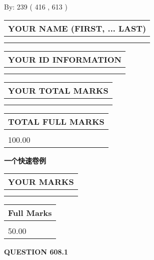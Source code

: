 \documentclass{ctexart}
\begin{document}
   
\hspace{1.0in} By: 
 239 ( 416 ,  613 )
   
   
   
   
\newpage 
\setcounter{page}{ 
   608001 } 
   
   
   
   
\noindent\begin{tabular}{|l|}
\hline
YOUR NAME (FIRST, ... LAST)  \\
\hline
 \\ 
 \\ 
\hline
\end{tabular}
\hspace{0.05in} \begin{tabular}{|l|}
\hline
 YOUR   ID   INFORMATION  \\
\hline
 \\ 
 \\ 
\hline
\end{tabular}
   
   
\vspace{0.2in}\noindent\begin{tabular}{|l|}
\hline
YOUR TOTAL MARKS  \\
\hline
 \\ 
 \\ 
\hline
\end{tabular}
\hspace{0.05in} \begin{tabular}{|l|}
\hline
TOTAL FULL MARKS  \\
\hline
 \\ 
100.00 \\
\hline
\end{tabular}
   
   
 \vspace{0.2in}
{\LARGE {\textbf{ 一个快速卷例}}}
   
   
  
\vspace{0.2in}
  
\noindent\begin{tabular}{|l|}
\hline
 YOUR MARKS  \\
\hline
 \\ 
 \\ 
\hline
\end{tabular}
\hspace{0.05in} \begin{tabular}{|l|}
\hline
 Full Marks  \\
\hline
 \\ 
50.00 \\
\hline
\end{tabular}
{\textbf{\Large{QUESTION
608.1 
}}}
  
\end{document}
